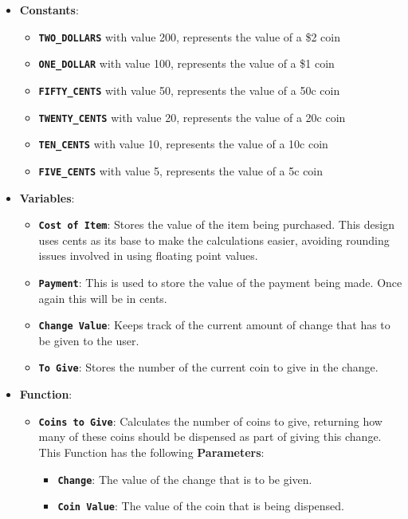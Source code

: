 \begin{itemize}
  \item \textbf{Constants}:
  \begin{itemize}
    \item \texttt{\textbf{TWO\_DOLLARS}} with value 200, represents the value of a \$2 coin
    \item \texttt{\textbf{ONE\_DOLLAR}} with value 100, represents the value of a \$1 coin
    \item \texttt{\textbf{FIFTY\_CENTS}} with value 50, represents the value of a 50c coin
    \item \texttt{\textbf{TWENTY\_CENTS}} with value 20, represents the value of a 20c coin
    \item \texttt{\textbf{TEN\_CENTS}} with value 10, represents the value of a 10c coin
    \item \texttt{\textbf{FIVE\_CENTS}} with value 5, represents the value of a 5c coin
  \end{itemize}
  \item \textbf{Variables}:
  \begin{itemize}
    \item \textbf{\texttt{Cost of Item}}: Stores the value of the item being purchased. This design uses cents as its base to make the calculations easier, avoiding rounding issues involved in using floating point values.
    \item \texttt{\textbf{Payment}}: This is used to store the value of the payment being made. Once again this will be in cents.
    \item \texttt{\textbf{Change Value}}: Keeps track of the current amount of change that has to be given to the user.
    \item \texttt{\textbf{To Give}}: Stores the number of the current coin to give in the change.
  \end{itemize}
  \item \textbf{Function}:
  \begin{itemize}
    \item \texttt{\textbf{Coins to Give}}: Calculates the number of coins to give, returning how many of these coins should be dispensed as part of giving this change. This Function has the following \textbf{Parameters}:
    \begin{itemize}
      \item \texttt{\textbf{Change}}: The value of the change that is to be given.
      \item \texttt{\textbf{Coin Value}}: The value of the coin that is being dispensed.

\end{itemize}
\end{itemize}
\end{itemize}
